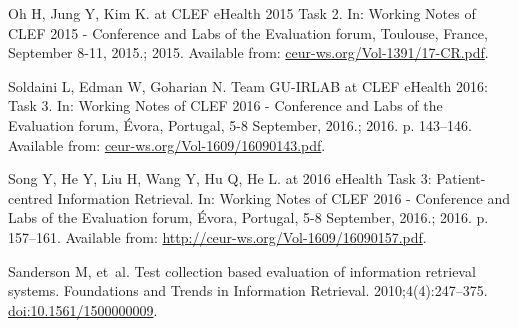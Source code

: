 \documentclass[10pt,a4paper]{article}
\begin{document}
\begin{thebibliography}{10}
	Oh H, Jung Y, Kim K.
	 at {CLEF} eHealth 2015 Task 2.
	\newblock In: Working Notes of {CLEF} 2015 - Conference and Labs of the
	Evaluation forum, Toulouse, France, September 8-11, 2015.; 2015. Available
	from: \url{ceur-ws.org/Vol-1391/17-CR.pdf}.
	
	Soldaini L, Edman W, Goharian N.
	\newblock Team {GU-IRLAB} at {CLEF} eHealth 2016: Task 3.
	\newblock In: Working Notes of {CLEF} 2016 - Conference and Labs of the
	Evaluation forum, {\'{E}}vora, Portugal, 5-8 September, 2016.; 2016. p.
	143--146.
	\newblock Available from: \url{ceur-ws.org/Vol-1609/16090143.pdf}.
	
	Song Y, He Y, Liu H, Wang Y, Hu Q, He L.
	 at 2016 eHealth Task 3: Patient-centred Information Retrieval.
	\newblock In: Working Notes of {CLEF} 2016 - Conference and Labs of the
	Evaluation forum, {\'{E}}vora, Portugal, 5-8 September, 2016.; 2016. p.
	157--161.
	\newblock Available from: \url{http://ceur-ws.org/Vol-1609/16090157.pdf}.
	
	Sanderson M, et~al.
	\newblock Test collection based evaluation of information retrieval systems.
	\newblock Foundations and Trends{\textregistered} in Information Retrieval.
	2010;4(4):247--375.
	\newblock \href {http://dx.doi.org/10.1561/1500000009}
	{doi:10.1561/1500000009}.
	
\end{thebibliography}
\end{document}
